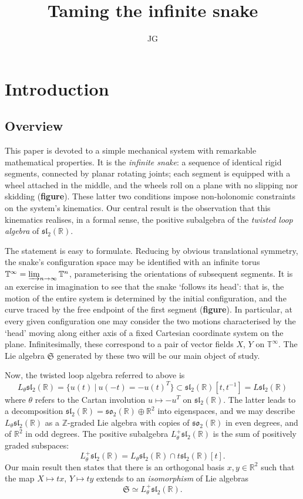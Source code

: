 \documentclass{article}
\title{Taming the infinite snake}
\author{JG}
\def\fsl{\mathfrak{sl}}
\def\fso{\mathfrak{so}}
\def\fS{\mathfrak{S}}
\def\ZZ{\mathbb{Z}}
\def\RR{\mathbb{R}}
\def\TT{\mathbb{T}}
\begin{document}
\sloppy\maketitle

\section{Introduction}
\label{sec:intro}
\subsection{Overview}
This paper is devoted to a simple mechanical
system with remarkable mathematical properties.
It is the \emph{infinite snake}: a sequence of 
identical rigid segments, connected by
planar rotating joints; each segment is
equipped with a wheel attached in the middle,
and the wheels roll 
on a plane with no slipping
nor skidding (\textbf{figure}). These latter two conditions
impose non-holonomic constraints on the system's kinematics.
Our central result is the observation that
this kinematics realises, in a formal sense, the positive
subalgebra of the 
\emph{twisted loop algebra} of $\fsl_2(\RR)$. 

The statement is easy to formulate. Reducing by obvious translational
symmetry, the snake's configuration space may be identified with an
infinite torus $\TT^\infty = \varinjlim_{n\to\infty} \TT^n$, parameterising
the orientations of subsequent segments.
It is an exercise in imagination to see that the snake `follows its head':
that is, the motion of the entire system is determined by the initial configuration,
and the curve traced by the free endpoint of the first segment (\textbf{figure}). 
In particular, at every given configuration one may consider the two motions characterised
by the `head' moving along either axis of a fixed Cartesian coordinate system on the plane.
Infinitesimally, these correspond to a pair of vector fields $X$, $Y$ on $\TT^\infty$.
The Lie algebra $\fS$ generated by these two will be our main object of study.

Now, the twisted loop algebra referred to above is
$$
L_\theta\fsl_2(\RR) = \{ u(t)\ |\ u(-t)=-u(t)^T \} \subset \fsl_2(\RR)[t,t^{-1}] = L\fsl_2(\RR)
$$
where $\theta$ refers to the Cartan involution $u \mapsto -u^T$ on $\fsl_2(\RR)$.
The latter leads to a decomposition $\fsl_2(\RR) = \fso_2(\RR) \oplus \RR^2$ into eigenspaces,
and we may describe $L_\theta\fsl_2(\RR)$ as a $\ZZ$-graded Lie algebra with copies of 
$\fso_2(\RR)$ in even degrees, and of $\RR^2$ in odd degrees.
The positive subalgebra $L_\theta^+\fsl_2(\RR)$ is the sum of positively graded subspaces:
$$
L_\theta^+\fsl_2(\RR) = L_\theta\fsl_2(\RR) \cap t \fsl_2(\RR)[t].
$$
Our main result then states that there is an orthogonal
basis $x,y\in\RR^2$ such that the map $X\mapsto tx$, $Y\mapsto ty$
extends to an \emph{isomorphism} of Lie algebras
$$\fS \simeq L_\theta^+\fsl_2(\RR). $$
\end{document}
